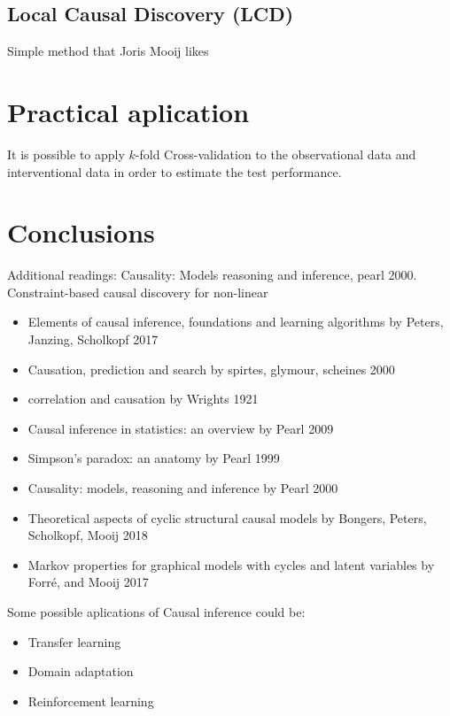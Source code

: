 \documentclass[b5paper]{report}
\begin{document}
\subsection{Local Causal Discovery (LCD)}

Simple method that Joris Mooij likes

\section{Practical aplication}

It is possible to apply $k$-fold Cross-validation to the observational data and
interventional data in order to estimate the test performance.

\section{Conclusions}

Additional readings: Causality: Models reasoning and inference, pearl 2000.
Constraint-based causal discovery for non-linear

\begin{itemize}
  \item Elements of causal inference, foundations and learning algorithms by
    Peters, Janzing, Scholkopf 2017 %
  \item Causation, prediction and search by spirtes, glymour, scheines 2000
  \item correlation and causation by Wrights 1921
  \item Causal inference in statistics: an overview by Pearl 2009
  \item Simpson's paradox: an anatomy by Pearl 1999 %
  \item Causality: models, reasoning and inference by Pearl 2000
  \item Theoretical aspects of cyclic structural causal models by
    Bongers, Peters, Scholkopf, Mooij 2018 %
  \item Markov properties for graphical models with cycles and latent
    variables by Forré, and Mooij 2017 %
\end{itemize}

Some possible aplications of Causal inference could be:

\begin{itemize}
  \item Transfer learning
  \item Domain adaptation
  \item Reinforcement learning
\end{itemize}
\end{document}
